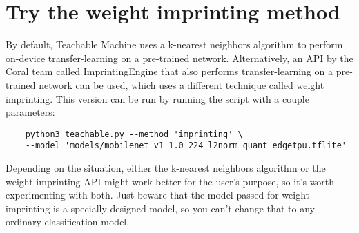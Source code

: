 \section{Try the weight imprinting method}

By default, Teachable Machine uses a k-nearest neighbors algorithm to perform on-device transfer-learning on a pre-trained network. Alternatively, an API by the Coral team called ImprintingEngine that also performs transfer-learning on a pre-trained network can be used, which uses a different technique called weight imprinting. This version can be run by running the script with a couple parameters:

\begin{verbatim}
	python3 teachable.py --method 'imprinting' \
	--model 'models/mobilenet_v1_1.0_224_l2norm_quant_edgetpu.tflite'
\end{verbatim}

Depending on the situation, either the k-nearest neighbors algorithm or the weight imprinting API might work better for the user's purpose, so it’s worth experimenting with both. Just beware that the model passed for weight imprinting is a specially-designed model, so you can't change that to any ordinary classification model.







